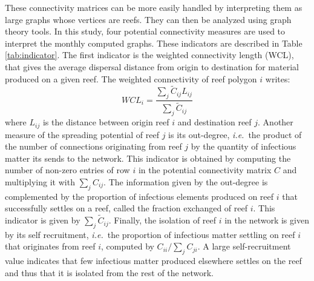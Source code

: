 \documentclass[utf8]{frontiersSCNS}
\newcommand{\ie}{{\it i.e.}\ }
\begin{document}
These connectivity matrices can be more easily handled by interpreting them as large graphs whose vertices are reefs. They can then be analyzed using graph theory tools. In this study, four potential connectivity measures are used to interpret the monthly computed graphs. These indicators are described in Table \ref{tab:indicator}. The first indicator is the weighted connectivity length (WCL), that gives the average dispersal distance from origin to destination for material produced on a given reef. The weighted connectivity of reef polygon $i$ writes:
\begin{equation}
    WCL_i = \dfrac{\sum_j \tilde{C}_{ij} L_{ij}}{\sum_j \tilde{C}_{ij}}
\end{equation}
where $L_{ij}$ is the distance between origin reef $i$ and destination reef $j$. Another measure of the spreading potential of reef $j$ is its out-degree, \ie the product of the number of connections originating from reef $j$ by the quantity of infectious matter its sends to the network. This indicator is obtained by computing the number of non-zero entries of row $i$ in the potential connectivity matrix $C$ and multiplying it with $\sum_j C_{ij}$. The information given by the out-degree is complemented by the proportion of infectious elements produced on reef $i$ that successfully settles on a reef, called the fraction exchanged of reef $i$. This indicator is given by $\sum_{j} \tilde{C}_{ij}$. Finally, the isolation of reef $i$ in the network is given by its self recruitment, \ie the proportion of infectious matter settling on reef $i$ that originates from reef $i$, computed by $C_{ii}/\sum_jC_{ji}$. A large self-recruitment value indicates that few infectious matter produced elsewhere settles on the reef and thus that it is isolated from the rest of the network. 
\end{document}
